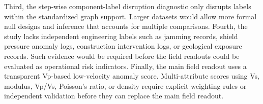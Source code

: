 Third, the step-wise component-label disruption diagnostic only disrupts labels within
the standardized graph support. Larger datasets would allow more formal null
designs and inference that accounts for multiple comparisons. Fourth, the
study lacks independent engineering labels such as jamming records, shield
pressure anomaly logs, construction intervention logs, or geological exposure
records. Such evidence would be required before the field readouts could be
evaluated as operational risk indicators. Finally, the main field readout uses a
transparent Vp-based low-velocity anomaly score. Multi-attribute scores using
Vs, modulus, Vp/Vs, Poisson's ratio, or density require explicit weighting
rules or independent validation before they can replace the main field readout.

